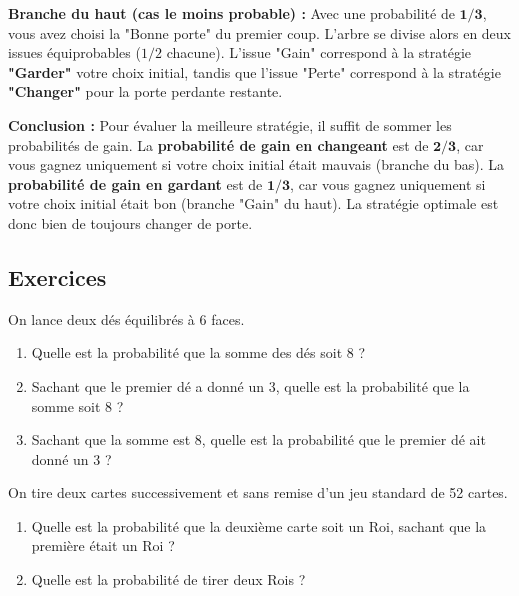 \begin{proofbox}
\noindent\textbf{Branche du haut (cas le moins probable) :}
Avec une probabilité de $\mathbf{1/3}$, vous avez choisi la "Bonne porte" du premier coup. L'arbre se divise alors en deux issues équiprobables ($1/2$ chacune). L'issue "Gain" correspond à la stratégie \textbf{"Garder"} votre choix initial, tandis que l'issue "Perte" correspond à la stratégie \textbf{"Changer"} pour la porte perdante restante.

\noindent\textbf{Conclusion :}
Pour évaluer la meilleure stratégie, il suffit de sommer les probabilités de gain. La \textbf{probabilité de gain en changeant} est de $\mathbf{2/3}$, car vous gagnez uniquement si votre choix initial était mauvais (branche du bas). La \textbf{probabilité de gain en gardant} est de $\mathbf{1/3}$, car vous gagnez uniquement si votre choix initial était bon (branche "Gain" du haut). La stratégie optimale est donc bien de toujours changer de porte.
\end{proofbox}

\subsection{Exercices}


\begin{exercicebox}
On lance deux dés équilibrés à 6 faces.
\begin{enumerate}
    \item Quelle est la probabilité que la somme des dés soit 8 ?
    \item Sachant que le premier dé a donné un 3, quelle est la probabilité que la somme soit 8 ?
    \item Sachant que la somme est 8, quelle est la probabilité que le premier dé ait donné un 3 ?
\end{enumerate}
\end{exercicebox}

\begin{exercicebox}
On tire deux cartes successivement et sans remise d'un jeu standard de 52 cartes.
\begin{enumerate}
    \item Quelle est la probabilité que la deuxième carte soit un Roi, sachant que la première était un Roi ?
    \item Quelle est la probabilité de tirer deux Rois ?
\end{enumerate}
\end{exercicebox}

